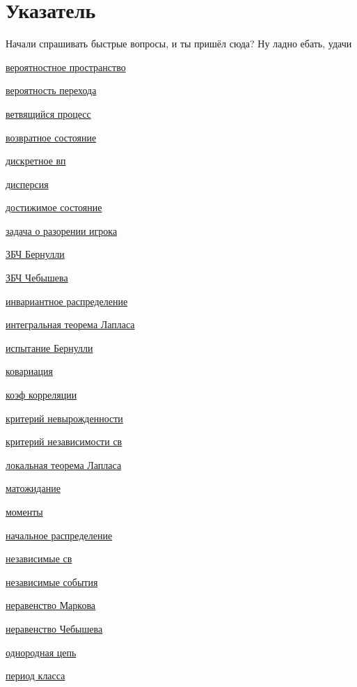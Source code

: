 \documentclass[a4paper,100pt]{article}
\theoremstyle{indented}
\theoremstyle{definition}
\theoremstyle{remark}
\begin{document}
\newpage

\section{Указатель}

\hypertarget{t2}{Начали спрашивать быстрые вопросы, и ты пришёл сюда? Ну ладно ебать, удачи}

\begin{multicols}{2}

\hyperlink{n1}{вероятностное пространство} \ 

\hyperlink{n32}{вероятность перехода} \ 

\hyperlink{n27}{ветвящийся процесс} \ 

\hyperlink{n42}{возвратное состояние} \

\hyperlink{n2}{дискретное вп} \ 

\hyperlink{n14}{дисперсия} \ 

\hyperlink{n36}{достижимое состояние} \ 

\hyperlink{n44}{задача о разорении игрока} \

\hyperlink{n22}{ЗБЧ Бернулли} \ 

\hyperlink{n21}{ЗБЧ Чебышева} \ 

\hyperlink{n33}{инвариантное распределение} \ 

\hyperlink{n25}{интегральная теорема Лапласа} \ 

\hyperlink{n12}{испытание Бернулли} \ 

\hyperlink{n19}{ковариация} \ 

\hyperlink{n20}{коэф корреляции} \ 

\hyperlink{n28}{критерий невырожденности} \ 

\hyperlink{n11}{критерий независимости св} \ 

\hyperlink{n24}{локальная теорема Лапласа} \ 

\hyperlink{n13}{матожидание} \ 

\hyperlink{n17}{моменты} \ 

\hyperlink{n31}{начальное распределение} \ 

\hyperlink{n10}{независимые св} \ 

\hyperlink{n7}{независимые события} \ 

\hyperlink{n15}{неравенство Маркова} \ 

\hyperlink{n16}{неравенство Чебышева} \ 

\hyperlink{n30}{однородная цепь} \ 

\hyperlink{n40}{период класса} \ 


\end{multicols}
\end{document}
